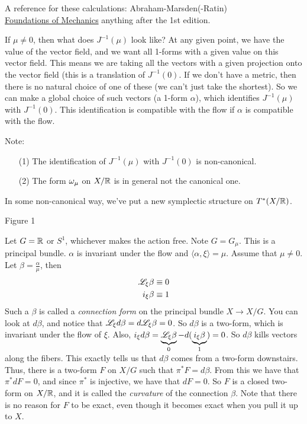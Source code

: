   A reference for these calculations: Abraham-Marsden(-Ratin) \\ \underline{Foundations
  of Mechanics} anything after the 1st edition.

 If $\mu\not=0$, then what does $J^{-1}(\mu)$ look like?  At any given point, we have
 the value of the vector field, and we want all 1-forms with a given value on this
 vector field.  This means we are taking all the vectors with a given projection onto
 the vector field (this is a translation of $J^{-1}(0)$.  If we don't have a metric,
 then there is no natural choice of one of these (we can't just take the shortest). So
 we can make a global choice of such vectors (a 1-form $\alpha$), which identifies
 $J^{-1}(\mu)$ with $J^{-1}(0)$.  This identification is compatible with the flow if
 $\alpha$ is compatible with the flow.

 Note:
 \begin{itemize}
 \item[(1)] The identification of $J^{-1}(\mu)$ with $J^{-1}(0)$ is non-canonical.
 \item[(2)] The form $\omega_\mu$ on $X/\mathbb{R}$ is in general not the canonical one.
 \end{itemize}

 In some non-canonical way, we've put a new symplectic structure on $T^*(X/\mathbb{R})$.

 Figure 1

 Let $G=\mathbb{R}$ or $S^1$, whichever makes the action free.  Note $G=G_\mu$.  This is a
 principal bundle.  $\alpha$ is invariant under the flow and $\langle
 \alpha,\xi\rangle =\mu$.  Assume that $\mu\not=0$.  Let $\beta=\frac{\alpha}{\mu}$,
 then
 \begin{align*}
   \mathscr{L}_\xi \beta &\equiv 0\\
   i_\xi \beta &\equiv 1
 \end{align*}
 Such a $\beta$ is called a \emph{connection form} on the principal bundle $X\to X/G$.
 You can look at $d\beta$, and notice that $\mathscr{L}_\xi d\beta = d\mathscr{L}_\xi\beta = 0$.  So
 $d\beta$ is a two-form, which is invariant under the flow of $\xi$.  Also, $ i_\xi
 d\beta = \underbrace{\mathscr{L}_\xi \beta}_0-d(\underbrace{i_\xi\beta}_1)=0$.  So $d\beta$
 kills vectors along the fibers.  This exactly tells us that $d\beta$ comes from a
 two-form downstairs.  Thus, there is a two-form $F$ on $X/G$ such that $\pi^*
 F=d\beta$.  From this we have that $\pi^*dF=0$, and since $\pi^*$ is injective, we
 have that $dF=0$.  So $F$ is a closed two-form on $X/\mathbb{R}$, and it is called the
 \emph{curvature} of the connection $\beta$.  Note that there is no reason for $F$ to
 be exact, even though it becomes exact when you pull it up to $X$.

